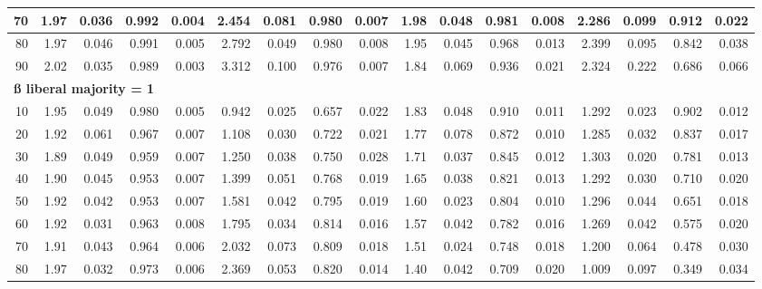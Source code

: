 \documentclass[
]{article}
\begin{document}
\begin{table}[H]
{\begin{tabular}{r|r|r|r|r|r|r|r|r|r|r|r|r|r|r|r|r}
\hline
\hspace{1em}70 & 1.97 & 0.036 & 0.992 & 0.004 & 2.454 & 0.081 & 0.980 & 0.007 & 1.98 & 0.048 & 0.981 & 0.008 & 2.286 & 0.099 & 0.912 & 0.022\\
\hline
\hspace{1em}80 & 1.97 & 0.046 & 0.991 & 0.005 & 2.792 & 0.049 & 0.980 & 0.008 & 1.95 & 0.045 & 0.968 & 0.013 & 2.399 & 0.095 & 0.842 & 0.038\\
\hline
\hspace{1em}90 & 2.02 & 0.035 & 0.989 & 0.003 & 3.312 & 0.100 & 0.976 & 0.007 & 1.84 & 0.069 & 0.936 & 0.021 & 2.324 & 0.222 & 0.686 & 0.066\\
\hline
\multicolumn{17}{l}{\textbf{ß liberal majority = 1}}\\
\hline
\hspace{1em}10 & 1.95 & 0.049 & 0.980 & 0.005 & 0.942 & 0.025 & 0.657 & 0.022 & 1.83 & 0.048 & 0.910 & 0.011 & 1.292 & 0.023 & 0.902 & 0.012\\
\hline
\hspace{1em}20 & 1.92 & 0.061 & 0.967 & 0.007 & 1.108 & 0.030 & 0.722 & 0.021 & 1.77 & 0.078 & 0.872 & 0.010 & 1.285 & 0.032 & 0.837 & 0.017\\
\hline
\hspace{1em}30 & 1.89 & 0.049 & 0.959 & 0.007 & 1.250 & 0.038 & 0.750 & 0.028 & 1.71 & 0.037 & 0.845 & 0.012 & 1.303 & 0.020 & 0.781 & 0.013\\
\hline
\hspace{1em}40 & 1.90 & 0.045 & 0.953 & 0.007 & 1.399 & 0.051 & 0.768 & 0.019 & 1.65 & 0.038 & 0.821 & 0.013 & 1.292 & 0.030 & 0.710 & 0.020\\
\hline
\hspace{1em}50 & 1.92 & 0.042 & 0.953 & 0.007 & 1.581 & 0.042 & 0.795 & 0.019 & 1.60 & 0.023 & 0.804 & 0.010 & 1.296 & 0.044 & 0.651 & 0.018\\
\hline
\hspace{1em}60 & 1.92 & 0.031 & 0.963 & 0.008 & 1.795 & 0.034 & 0.814 & 0.016 & 1.57 & 0.042 & 0.782 & 0.016 & 1.269 & 0.042 & 0.575 & 0.020\\
\hline
\hspace{1em}70 & 1.91 & 0.043 & 0.964 & 0.006 & 2.032 & 0.073 & 0.809 & 0.018 & 1.51 & 0.024 & 0.748 & 0.018 & 1.200 & 0.064 & 0.478 & 0.030\\
\hline
\hspace{1em}80 & 1.97 & 0.032 & 0.973 & 0.006 & 2.369 & 0.053 & 0.820 & 0.014 & 1.40 & 0.042 & 0.709 & 0.020 & 1.009 & 0.097 & 0.349 & 0.034\\

\end{tabular}}
\end{table}
\end{document}
